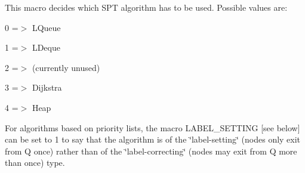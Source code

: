 This macro decides which S\+PT algorithm has to be used. Possible values are\+:


\begin{DoxyItemize}
\item 0 =$>$ L\+Queue
\item 1 =$>$ L\+Deque
\item 2 =$>$ (currently unused)
\item 3 =$>$ Dijkstra
\item 4 =$>$ Heap
\end{DoxyItemize}

For algorithms based on priority lists, the macro L\+A\+B\+E\+L\+\_\+\+S\+E\+T\+T\+I\+NG \mbox{[}see below\mbox{]} can be set to 1 to say that the algorithm is of the \char`\"{}label-\/setting\char`\"{} (nodes only exit from Q once) rather than of the \char`\"{}label-\/correcting\char`\"{} (nodes may exit from Q more than once) type. 
